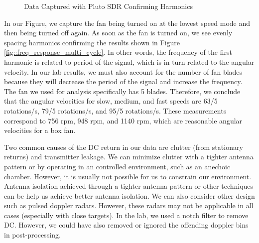 \documentclass{article}
\begin{document}
\begin{figure}[H]
    	\centering
    	\caption{Data Captured with Pluto SDR Confirming Harmonics}
    	\label{fig::dopp_harmonics}
\end{figure}

\noindent In our Figure, we capture the fan being turned on at the lowest speed mode and then being turned off again. As soon as the fan is turned on, we see evenly spacing harmonics confirming the results shown in Figure \ref{fig::freq_response_multi_cycle}. In other words, the frequency of the first harmonic is related to period of the signal, which is in turn related to the angular velocity. In our lab results, we must also account for the number of fan blades because they will decrease the period of the signal and increase the frequency. The fan we used for analysis specifically has 5 blades. Therefore, we conclude that the angular velocities for slow, medium, and fast speeds are 63/5 rotations/s, 79/5 rotations/s, and 95/5 rotations/s. These measurements correspond to 756 rpm, 948 rpm, and 1140 rpm, which are reasonable angular velocities for a box fan.

Two common causes of the DC return in our data are clutter (from stationary returns) and transmitter leakage. We can minimize clutter with a tighter antenna pattern or by operating in an controlled environment, such as an anechoic chamber. However, it is usually not possible for us to constrain our environment. Antenna isolation achieved through a tighter antenna pattern or other techniques can be help us achieve better antenna isolation. We can also consider other design such as pulsed doppler radars. However, these radars may not be applicable in all cases (especially with close targets). In the lab, we used a notch filter to remove DC. However, we could have also removed or ignored the offending doppler bins in post-processing.
\end{document}
